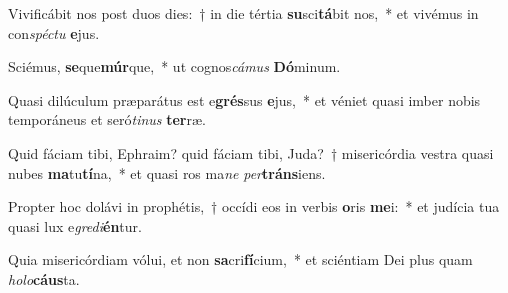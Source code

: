 \item Vivificábit nos post duos dies:~† in die tértia \textbf{su}sci\textbf{tá}bit nos,~* et vivémus in con\textit{spéc}\textit{tu} \textbf{e}jus.
\item Sciémus, \textbf{se}que\textbf{múr}que,~* ut cognos\textit{cá}\textit{mus} \textbf{Dó}minum.
\item Quasi dilúculum præparátus est e\textbf{grés}sus \textbf{e}jus,~* et véniet quasi imber nobis temporáneus et seró\textit{ti}\textit{nus} \textbf{ter}ræ.
\item Quid fáciam tibi, Ephraim? quid fáciam tibi, Juda?~† misericórdia vestra quasi nubes \textbf{ma}tu\textbf{tí}na,~* et quasi ros ma\textit{ne} \textit{per}\textbf{tráns}iens.
\item Propter hoc dolávi in prophétis,~† occídi eos in verbis \textbf{o}ris \textbf{me}i:~* et judícia tua quasi lux e\textit{gre}\textit{di}\textbf{én}tur.
\item Quia misericórdiam vólui, et non \textbf{sa}cri\textbf{fí}cium,~* et sciéntiam Dei plus quam \textit{ho}\textit{lo}\textbf{cáus}ta.
